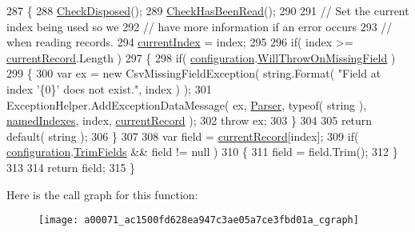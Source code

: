 \begin{DoxyCode}
287         \{
288             \hyperlink{a00071_a6fa45a46ed1322dc1872ca2321b5edbc}{CheckDisposed}();
289             \hyperlink{a00071_a2d9249171ed1568e45d152766d364c31}{CheckHasBeenRead}();
290 
291             \textcolor{comment}{// Set the current index being used so we}
292             \textcolor{comment}{// have more information if an error occurs}
293             \textcolor{comment}{// when reading records.}
294             \hyperlink{a00071_a56e974bc7e2242912e956393e831e166}{currentIndex} = index;
295 
296             \textcolor{keywordflow}{if}( index >= \hyperlink{a00071_ab2bfef15784add66e441c9d3a0d73751}{currentRecord}.Length )
297             \{
298                 \textcolor{keywordflow}{if}( \hyperlink{a00071_a695622911e45cbac8d67dcbd9a3e2967}{configuration}.\hyperlink{a00057_a13cb7999b190a01177134faa52dfa3db}{WillThrowOnMissingField} )
299                 \{
300                     var ex = \textcolor{keyword}{new} CsvMissingFieldException( \textcolor{keywordtype}{string}.Format( \textcolor{stringliteral}{"Field at index '\{0\}' does not
       exist."}, index ) );
301                     ExceptionHelper.AddExceptionDataMessage( ex, \hyperlink{a00071_a67874ae540cf6cf32522a38167a3f3b6}{Parser}, typeof( \textcolor{keywordtype}{string} ), 
      \hyperlink{a00071_a3114f49bd2b3c4966f4b15a310747aeb}{namedIndexes}, index, \hyperlink{a00071_ab2bfef15784add66e441c9d3a0d73751}{currentRecord} );
302                     \textcolor{keywordflow}{throw} ex;
303                 \}
304 
305                 \textcolor{keywordflow}{return} \textcolor{keywordflow}{default}( \textcolor{keywordtype}{string} );
306             \}
307 
308             var field = \hyperlink{a00071_ab2bfef15784add66e441c9d3a0d73751}{currentRecord}[index];
309             \textcolor{keywordflow}{if}( \hyperlink{a00071_a695622911e45cbac8d67dcbd9a3e2967}{configuration}.\hyperlink{a00057_a100f3a2268218bfba3088f4ca1d6a7ad}{TrimFields} && field != null )
310             \{
311                 field = field.Trim();
312             \}
313 
314             \textcolor{keywordflow}{return} field;
315         \}
\end{DoxyCode}


Here is the call graph for this function\-:
\nopagebreak
\begin{figure}[H]
\begin{center}
\leavevmode
\texttt{[image: a00071\_ac1500fd628ea947c3ae05a7ce3fbd01a\_cgraph]}
\end{center}
\end{figure}




